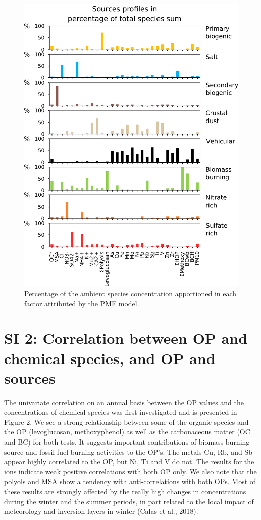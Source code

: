 \documentclass[12pt]{article}
\begin{document}
\begin{figure}[h]
    \centering
    \includegraphics{figures/SI_fig01}
    \caption{Percentage of the ambient species concentration apportioned in each
        factor attributed by the PMF model.}
    \label{fig:concPercent}
\end{figure}

\section{SI 2: Correlation between OP and chemical species, and OP and
sources}\label{si-2-correlation-between-op-and-chemical-species-and-op-and-sources}

The univariate correlation on an annual basis between the OP values and
the concentrations of chemical species was first investigated and is
presented in Figure 2. We see a strong relationship between some of the
organic species and the OP (levoglucosan, methoxyphenol) as well as the
carbonaceous matter (OC and BC) for both tests. It suggests important
contributions of biomass burning source and fossil fuel burning
activities to the OP's. The metals Cu, Rb, and Sb appear highly
correlated to the OP, but Ni, Ti and V do not. The results for the ions
indicate weak positive correlations with both OP only. We also note that
the polyols and MSA show a tendency with anti-correlations with both
OPs. Most of these results are strongly affected by the really high
changes in concentrations during the winter and the summer periods, in
part related to the local impact of meteorology and inversion layers in
winter (Calas et al., 2018).
\end{document}
